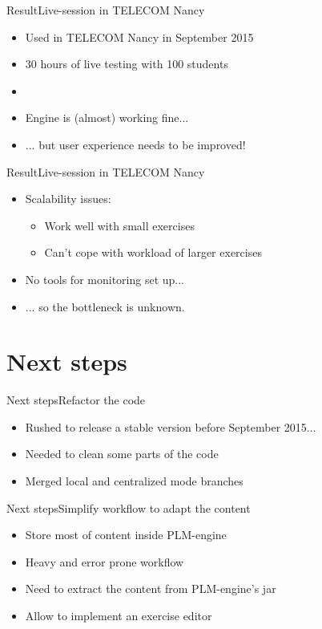 \documentclass{beamer}
\begin{document}
\begin{frame}{Result}{Live-session in TELECOM Nancy}
  \begin{itemize}
  \item {
    Used in TELECOM Nancy in September 2015
  }
  \item {
    30 hours of live testing with 100 students
    \pause
  }
  \item[~]
  \item {
    Engine is (almost) working fine...
  }
  \item {
    ... but user experience needs to be improved!
  }
  \end{itemize}
\end{frame}


\begin{frame}{Result}{Live-session in TELECOM Nancy}
  \begin{itemize}
  \item {
    Scalability issues:
    \begin{itemize}
    \item Work well with small exercises
    \item Can't cope with workload of larger exercises
    \end{itemize}
    \pause
  }
  \item {
    No tools for monitoring set up...
    \pause
  }
  \item {
    ... so the bottleneck is unknown.
  }
  \end{itemize}
\end{frame}

\section{Next steps}

\begin{frame}{Next steps}{Refactor the code}
  \begin{itemize}
  \item {
    Rushed to release a stable version before September 2015...
  }
  \item {
    Needed to clean some parts of the code
  }
  \item {
    Merged local and centralized mode branches
  }
  \end{itemize}
\end{frame}

\begin{frame}{Next steps}{Simplify workflow to adapt the content}
  \begin{itemize}
  \item {
    Store most of content inside PLM-engine
  }
  \item {
    Heavy and error prone workflow
  }
  \item {
    Need to extract the content from PLM-engine's jar
  }
  \item {
    Allow to implement an exercise editor
  }
  \end{itemize}
\end{frame}
\end{document}
